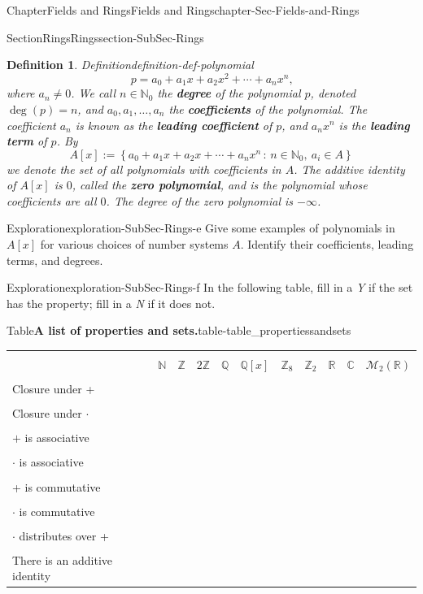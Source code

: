 \documentclass[oneside,10pt,]{book}
\newcommand{\tabularfont}{\relax}
\newcommand{\terminology}[1]{\textbf{#1}}
\numberwithin{equation}{section}
\newcommand{\hrulethin}  {\noalign{\hrule height 0.04em}}
\newcommand{\setof}[2]{{\left\{#1\,\colon\,#2\right\}}}
\def\C{{\mathbb C}}
\def\Z{{\mathbb Z}}
\def\Q{{\mathbb Q}}
\def\N{{\mathbb N}}
\def\R{{\mathbb R}}
\newtheorem{definition}[theorem]{Definition}
\begin{document}
\begin{chapterptx}{Chapter}{Fields and Rings}{}{Fields and Rings}{}{}{chapter-Sec-Fields-and-Rings}
\begin{sectionptx}{Section}{Rings}{}{Rings}{}{}{section-SubSec-Rings}
\begin{definition}{Definition}{}{definition-def-polynomial}
\begin{equation*}
p = a_0 + a_1 x + a_2 x^2 + \cdots + a_n x^n\text{,}
\end{equation*}
where \(a_n\ne 0\). We call \(n\in \N_0\) the \terminology{degree} of the polynomial \(p\), denoted \(\deg(p) = n\), and \(a_0,a_1,\ldots,
a_n\) the \terminology{coefficients} of the polynomial. The coefficient \(a_n\) is known as the \terminology{leading coefficient} of \(p\), and \(a_n x^n\) is the \terminology{leading term} of \(p\). By%
\begin{equation*}
A[x] := \setof{a_0 + a_1 x + a_2 x + \cdots + a_n x^n}{n\in \N_0, \ a_i\in A}
\end{equation*}
we denote the set of all polynomials with coefficients in \(A\). The additive identity of \(A[x]\) is \(0\), called the \terminology{zero polynomial}, and is the polynomial whose coefficients are all \(0\). The degree of the zero polynomial is \(-\infty\).%
\end{definition}
\begin{exploration}{Exploration}{}{exploration-SubSec-Rings-e}%
Give some examples of polynomials in \(A[x]\) for various choices of number systems \(A\). Identify their coefficients, leading terms, and degrees.%
\end{exploration}%
\begin{exploration}{Exploration}{}{exploration-SubSec-Rings-f}%
In the following table, fill in a \emph{Y} if the set has the property; fill in a \emph{N} if it does not.%
\begin{tableptx}{Table}{\textbf{A list of properties and sets.}}{table-table_propertiessandsets}{}%
\centering%
{\tabularfont%
\begin{tabular}{lllllllllll}
&&&&&&&&&&\tabularnewline\hrulethin
&\(\N\)&\(\Z\)&\(2\Z\)&\(\Q\)&\(\Q[x]\)&\(\Z_{8}\)&\(\Z_{2}\)&\(\R\)&\(\C\)&\(\mathcal{M}_2(\R)\)\tabularnewline[0pt]
&&&&&&&&&&\tabularnewline\hrulethin
Closure under +&&&&&&&&&&\tabularnewline[0pt]
&&&&&&&&&&\tabularnewline\hrulethin
Closure under \(\cdot\)&&&&&&&&&&\tabularnewline[0pt]
&&&&&&&&&&\tabularnewline\hrulethin
\(+\) is associative&&&&&&&&&&\tabularnewline[0pt]
&&&&&&&&&&\tabularnewline\hrulethin
\(\cdot\) is associative&&&&&&&&&&\tabularnewline[0pt]
&&&&&&&&&&\tabularnewline\hrulethin
+ is commutative&&&&&&&&&&\tabularnewline[0pt]
&&&&&&&&&&\tabularnewline\hrulethin
\(\cdot\) is commutative&&&&&&&&&&\tabularnewline[0pt]
&&&&&&&&&&\tabularnewline\hrulethin
\(\cdot\) distributes over +&&&&&&&&&&\tabularnewline[0pt]
&&&&&&&&&&\tabularnewline\hrulethin
There is an additive identity&&&&&&&&&&\tabularnewline[0pt]

\end{tabular}}
\end{tableptx}
\end{exploration}
\end{sectionptx}
\end{chapterptx}
\end{document}
